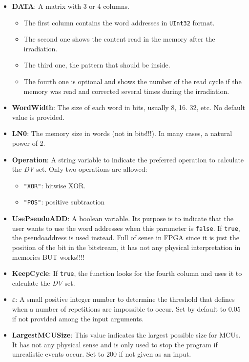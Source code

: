 \begin{itemize}
\begin{itemize}
 			\item   \textbf{DATA}: A matrix with 3 or 4 columns. 
 			\begin{itemize}
 				\item The first column contains the word addresses in \texttt{UInt32} format.
 				\item The second one shows the content read in the memory after the irradiation.
 				\item The third one, the pattern that should be inside.
 				\item  The fourth one is optional and shows the number of the read cycle if the   memory was read and corrected several times during the irradiation.
 			\end{itemize}
 			\item   \textbf{WordWidth}: The size of each word in bits, usually 8, 16. 32, etc. No default value is provided.
 			\item   \textbf{LN0}: The memory size in words (not in bits!!!). In many cases, a natural power of 2.
 			\item   \textbf{Operation}: A string variable to indicate the preferred operation to calculate
 			the \textit{DV} set. Only two operations are allowed: 
 			\begin{itemize}
 				\item \texttt{"XOR"}: bitwise XOR.
 				\item\texttt{"POS"}: positive subtraction
 			\end{itemize}
 			\item  \textbf{UsePseudoADD}: A boolean variable. Its purpose is to indicate that the user wants to use the word addresses when this parameter is \texttt{false}. If \texttt{true}, the pseudoaddress  is used instead. Full of sense in FPGA since it is just the position  of the bit in the bitstream, it has not any physical interpretation in memories BUT works!!!!
 			\item   \textbf{KeepCycle}: If \texttt{true}, the function looks for the fourth column and uses it to calculate the \textit{DV} set.
 			\item   \textbf{\(\varepsilon\)}: A small positive integer number to determine the threshold that defines when a number of repetitions are impossible to occur. Set by default to 0.05 if not provided among the input arguments.
 			\item  \textbf{LargestMCUSize}: This value indicates the largest possible size for MCUs. It has not any physical sense  and is only used to stop the program if unrealistic events occur. Set to 200 if not given as an input.
 			

\end{itemize}
\end{itemize}
